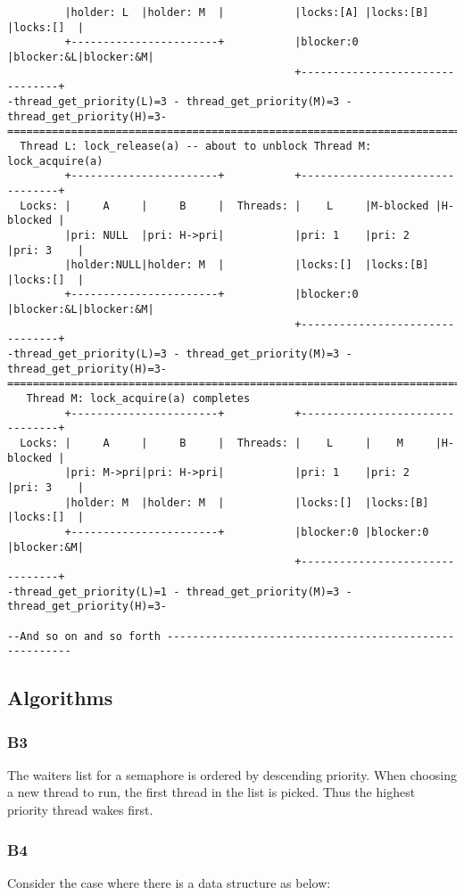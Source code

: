 \documentclass[a4wide, 11pt]{article}
\begin{document}
\begin{verbatim}
         |holder: L  |holder: M  |           |locks:[A] |locks:[B] |locks:[]  |
         +-----------------------+           |blocker:0 |blocker:&L|blocker:&M|
                                             +--------------------------------+
-thread_get_priority(L)=3 - thread_get_priority(M)=3 - thread_get_priority(H)=3-
================================================================================
  Thread L: lock_release(a) -- about to unblock Thread M: lock_acquire(a) 
         +-----------------------+           +--------------------------------+
  Locks: |     A     |     B     |  Threads: |    L     |M-blocked |H-blocked |
         |pri: NULL  |pri: H->pri|           |pri: 1    |pri: 2    |pri: 3    |
         |holder:NULL|holder: M  |           |locks:[]  |locks:[B] |locks:[]  |
         +-----------------------+           |blocker:0 |blocker:&L|blocker:&M|
                                             +--------------------------------+
-thread_get_priority(L)=3 - thread_get_priority(M)=3 - thread_get_priority(H)=3-
================================================================================
   Thread M: lock_acquire(a) completes
         +-----------------------+           +--------------------------------+
  Locks: |     A     |     B     |  Threads: |    L     |    M     |H-blocked |
         |pri: M->pri|pri: H->pri|           |pri: 1    |pri: 2    |pri: 3    |
         |holder: M  |holder: M  |           |locks:[]  |locks:[B] |locks:[]  |
         +-----------------------+           |blocker:0 |blocker:0 |blocker:&M|
                                             +--------------------------------+
-thread_get_priority(L)=1 - thread_get_priority(M)=3 - thread_get_priority(H)=3-

--And so on and so forth -------------------------------------------------------
\end{verbatim}

\subsection{Algorithms}
\subsubsection{B3}
The waiters list for a semaphore is ordered by descending priority. When choosing a new thread to run, the first thread in the list is picked. Thus the highest priority thread wakes first.
\subsubsection{B4}
Consider the case where there is a data structure as below:
\end{document}
